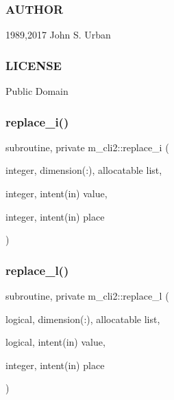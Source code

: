 \subsubsection*{A\+U\+T\+H\+OR}

1989,2017 John S. Urban \subsubsection*{L\+I\+C\+E\+N\+SE}

Public Domain \mbox{\label{namespacem__cli2_a0a591fd55e8010f26eb6f9f6bafc1ddb}} 
\subsubsection{\texorpdfstring{replace\+\_\+i()}{replace\_i()}}
{\footnotesize\ttfamily subroutine, private m\+\_\+cli2\+::replace\+\_\+i (\begin{DoxyParamCaption}\item[{integer, dimension(\+:), allocatable}]{list,  }\item[{integer, intent(in)}]{value,  }\item[{integer, intent(in)}]{place }\end{DoxyParamCaption})\hspace{0.3cm}{\ttfamily [private]}}

\mbox{\label{namespacem__cli2_ae4a1802207f6b67e36cbf89003d6fb55}} 
\subsubsection{\texorpdfstring{replace\+\_\+l()}{replace\_l()}}
{\footnotesize\ttfamily subroutine, private m\+\_\+cli2\+::replace\+\_\+l (\begin{DoxyParamCaption}\item[{logical, dimension(\+:), allocatable}]{list,  }\item[{logical, intent(in)}]{value,  }\item[{integer, intent(in)}]{place }\end{DoxyParamCaption})\hspace{0.3cm}{\ttfamily [private]}}

